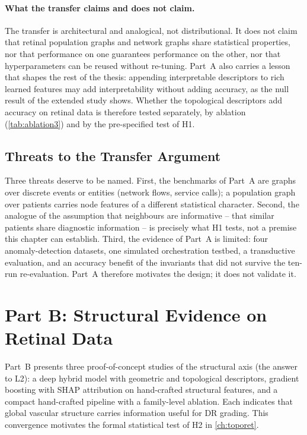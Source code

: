 \paragraph{What the transfer claims and does not claim.}
The transfer is architectural and analogical, not distributional. It does not claim that
retinal population graphs and network graphs share statistical properties, nor that
performance on one guarantees performance on the other, nor that hyperparameters can be
reused without re-tuning. Part~A also carries a lesson that shapes the rest of the thesis:
appending interpretable descriptors to rich learned features may add interpretability
without adding accuracy, as the null result of the extended study shows. Whether the
topological descriptors add accuracy on retinal data is therefore tested separately, by
ablation (\cref{tab:ablation3}) and by the pre-specified test of H1.

\subsection{Threats to the Transfer Argument}
\label{sec:threats}

Three threats deserve to be named. First, the benchmarks of Part~A are graphs over
discrete events or entities (network flows, service calls); a population graph over
patients carries node features of a different statistical character. Second, the
analogue of the assumption that neighbours are informative -- that similar patients share
diagnostic information -- is precisely what H1 tests, not a premise this chapter can
establish. Third, the evidence of Part~A is limited: four anomaly-detection datasets, one
simulated orchestration testbed, a transductive evaluation, and an accuracy benefit of
the invariants that did not survive the ten-run re-evaluation. Part~A therefore motivates
the design; it does not validate it.

\section{Part B: Structural Evidence on Retinal Data}
\label{sec:partb}

Part~B presents three proof-of-concept studies of the structural axis (the answer to L2):
a deep hybrid model with geometric and topological descriptors, gradient boosting with
SHAP attribution on hand-crafted structural features, and a compact hand-crafted pipeline
with a family-level ablation. Each indicates that global vascular structure carries
information useful for DR grading. This convergence motivates the formal statistical test
of H2 in \cref{ch:toporet}.

